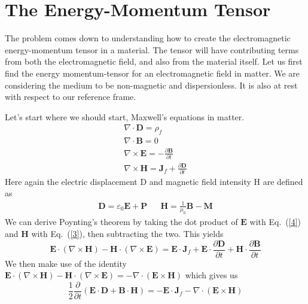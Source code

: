 %
\newpage
\section{The Energy-Momentum Tensor}

The problem comes down to understanding how to create the electromagnetic energy-momentum tensor in a material.  The tensor will have contributing terms from both the electromagnetic field, and also from the material itself. Let us first find the energy momentum-tensor for an electromagnetic field in matter.  We are considering the medium to be non-magnetic and dispersionless.  It is also at rest with respect to our reference frame. 

Let's start where we should start, Maxwell's equations in matter.
\begin{align}
&\nabla\cdot\mathbf{D}=\rho_f& \label{1}\\
&\nabla\cdot\mathbf{B}=0& \label{2}\\ 
&\nabla\times\mathbf{E}= -\frac{\partial\mathbf{B}}{\partial t}& \label{3}\\
&\nabla\times\mathbf{H}=\mathbf{J}_f+\frac{\partial\mathbf{D}}{\partial t}&\label{4}
\end{align}
Here again the electric displacement $\mathrm{D}$ and magnetic field intensity $\mathrm{H}$ are defined as
\begin{align}
&\mathbf{D}=\varepsilon_0\mathbf{E}+\mathbf{P}& 
&\mathbf{H}=\frac{1}{\mu_0}\mathbf{B}-\mathbf{M}& 
\end{align}
We can derive Poynting's theorem by taking the dot product of $\mathbf{E}$ with Eq.\ (\ref{4}) and $\mathbf{H}$ with Eq.\ (\ref{3}), then subtracting the two.  This yields
\begin{equation}
\mathbf{E}\cdot\left(\nabla\times\mathbf{H}\right) -\mathbf{H}\cdot\left(\nabla\times\mathbf{E}\right)=\mathbf{E}\cdot\mathbf{J}_f+\mathbf{E}\cdot\frac{\partial\mathbf{D}}{\partial t} +\mathbf{H}\cdot\frac{\partial\mathbf{B}}{\partial t}
\end{equation}
We then make use of the identity $\mathbf{E}\cdot\left(\nabla\times\mathbf{H}\right) -\mathbf{H}\cdot\left(\nabla\times\mathbf{E}\right)= -\nabla\cdot\left(\mathbf{E}\times\mathbf{H}\right)$ which gives us
\begin{equation}
\frac{1}{2}\frac{\partial}{\partial t}\left(\mathbf{E}\cdot\mathbf{D} + \mathbf{B}\cdot\mathbf{H}\right) =-\mathbf{E}\cdot\mathbf{J}_f-\nabla\cdot\left(\mathbf{E}\times\mathbf{H}\right)
\label{poyntingthm}
\end{equation}
